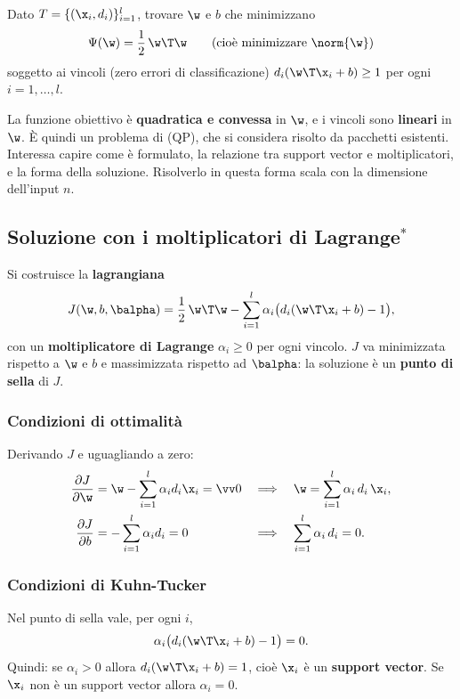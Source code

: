 \begin{definizione}
Dato $T = \{(\x_i,d_i)\}_{i=1}^l$, trovare $\w$ e $b$ che minimizzano
\[
\Psi(\w) = \frac12\,\w\T\w \qquad(\text{cioè minimizzare }\norm{\w})
\]
soggetto ai vincoli (zero errori di classificazione) $d_i(\w\T\x_i+b)\ge1$ per ogni $i=1,\dots,l$.
\end{definizione}

La funzione obiettivo è \textbf{quadratica e convessa} in $\w$, e i vincoli sono \textbf{lineari} in $\w$. È quindi
un problema di  (QP), che si considera risolto da pacchetti esistenti.
Interessa capire come è formulato, la relazione tra support vector e moltiplicatori, e la forma della soluzione.
Risolverlo in questa forma scala con la dimensione dell'input $n$.

\subsection{Soluzione con i moltiplicatori di Lagrange$^*$}

Si costruisce la \textbf{lagrangiana}
\begin{equation}\label{eq:lagrangiana}
J(\w,b,\balpha) = \frac12\,\w\T\w - \sum_{i=1}^{l}\alpha_i\big(d_i(\w\T\x_i+b)-1\big),
\end{equation}
con un \textbf{moltiplicatore di Lagrange} $\alpha_i\ge0$ per ogni vincolo. $J$ va minimizzata rispetto a $\w$ e
$b$ e massimizzata rispetto ad $\balpha$: la soluzione è un \textbf{punto di sella} di $J$.

\subsubsection{Condizioni di ottimalità}
Derivando $J$ e uguagliando a zero:
\begin{align}
\frac{\partial J}{\partial\w} &= \w - \sum_{i=1}^l\alpha_id_i\x_i = \vv0 &&\Longrightarrow\quad \w = \sum_{i=1}^{l}\alpha_i\,d_i\,\x_i , \label{eq:w-alfa}\\
\frac{\partial J}{\partial b} &= -\sum_{i=1}^l\alpha_id_i = 0 &&\Longrightarrow\quad \sum_{i=1}^{l}\alpha_i\,d_i = 0 . \label{eq:somma-alfa}
\end{align}

\subsubsection{Condizioni di Kuhn-Tucker}
Nel punto di sella vale, per ogni $i$,
\[
\alpha_i\big(d_i(\w\T\x_i+b)-1\big) = 0 .
\]
Quindi: se $\alpha_i>0$ allora $d_i(\w\T\x_i+b) = 1$, cioè $\x_i$ è un \textbf{support vector}. Se $\x_i$ non è un
support vector allora $\alpha_i=0$.

